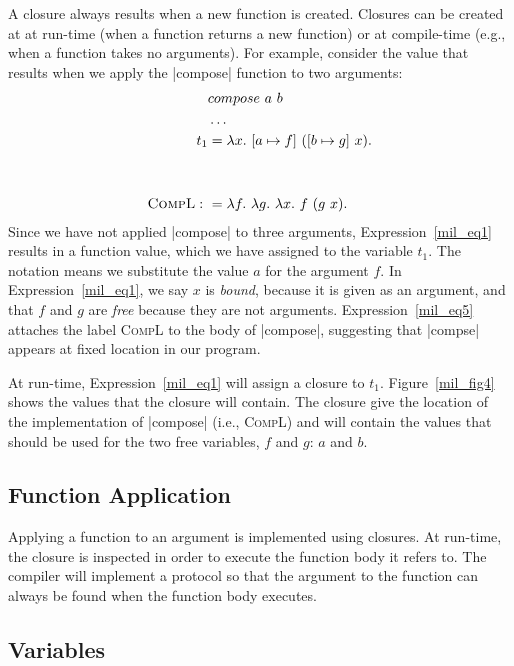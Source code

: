 \documentclass[12pt]{report}
\begin{document}
A closure always results when a new function is created. Closures can
be created at at run-time (when a function returns a new function) or
at compile-time (e.g., when a function takes no arguments). For
example, consider the value that results when we apply the |compose|
function to two arguments:
\begin{equation}
  \begin{align}
    & compose\ a\ b \notag\\
    & \dots \notag\\
    t_1 &= \lambda x.\ [a \mapsto f]\ ([b \mapsto g]\ x).  \label{mil_eq1} \\ \notag\\\notag\\
    \text{\sc CompL}:\ &= \lambda f.\ \lambda g.\ \lambda x.\ f\ (g\ x). \label{mil_eq5}
  \end{align}
\end{equation}
Since we have not applied |compose| to three arguments,
Expression~\eqref{mil_eq1} results in a function value, which we have
assigned to the variable $t_1$. The notation  means we
substitute the value $a$ for the argument $f$. In
Expression~\eqref{mil_eq1}, we say $x$ is \emph{bound}, because it is
given as an argument, and that $f$ and $g$ are \emph{free} because
they are not arguments. Expression~\eqref{mil_eq5} attaches the label
\textsc{CompL} to the body of |compose|, suggesting that |compse|
appears at fixed location in our program.

At run-time, Expression~\eqref{mil_eq1} will assign a closure to
$t_1$. Figure~\ref{mil_fig4} shows the values that the closure will
contain.  The closure give the location of the implementation of
|compose| (i.e., \textsc{CompL}) and will contain the values that
should be used for the two free variables, $f$ and $g$: $a$ and $b$.

\subsection{Function Application}
\label{mil_subsec5}

Applying a function to an argument is implemented using closures. At
run-time, the closure is inspected in order to execute the function
body it refers to. The compiler will implement a protocol so that the
argument to the function can always be found when the function body
executes.


\subsection{Variables}
\label{mil_subsec1}
\end{document}
